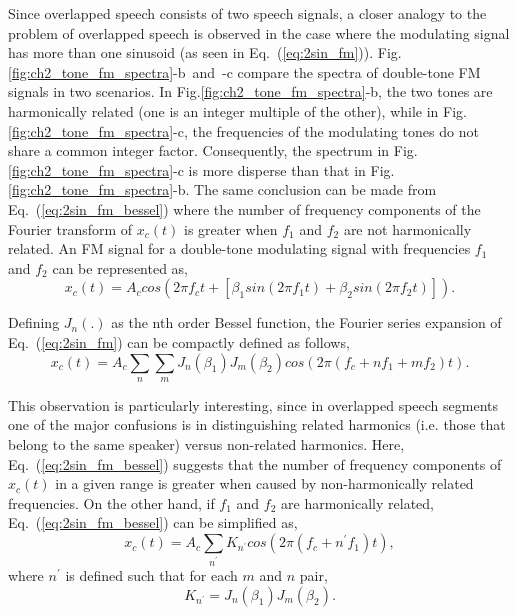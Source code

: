 {Since overlapped speech consists of two speech signals, a closer analogy to the problem of overlapped speech is observed in the case where the modulating signal has more than one sinusoid (as seen in Eq.~(\ref{eq:2sin_fm})). 
Fig.\ref{fig:ch2_tone_fm_spectra}-b~and~-c compare the spectra of double-tone FM signals in two scenarios. 
In Fig.\ref{fig:ch2_tone_fm_spectra}-b, the two tones are harmonically related (one is an integer multiple of the other), while in Fig.\ref{fig:ch2_tone_fm_spectra}-c, the frequencies of the modulating tones do not share a common integer factor. 
Consequently, the spectrum in Fig. \ref{fig:ch2_tone_fm_spectra}-c is more disperse than that in Fig.\ref{fig:ch2_tone_fm_spectra}-b. 
The same conclusion can be made from Eq.~(\ref{eq:2sin_fm_bessel}) where the number of frequency components of the Fourier transform of $x_c(t)$ is greater when $f_1$ and $f_2$ are not harmonically related. 
An FM signal for a double-tone modulating signal with frequencies $f_1$ and $f_2$ can be represented as,
\begin{equation}
\label{eq:2sin_fm}
x_c(t) = A_ccos(2\pi f_ct+[\beta_1 sin(2\pi f_1t) + \beta_2 sin(2\pi f_2t)]).
\end{equation}

Defining $J_n(.)$ as the nth order Bessel function, the Fourier series expansion of Eq.~(\ref{eq:2sin_fm}) can be compactly defined as follows, 
\begin{equation}
\label{eq:2sin_fm_bessel}
x_c(t) = A_c\sum\limits_n\sum\limits_m J_n(\beta_1)J_m(\beta_2)cos(2\pi (f_c+nf_1+mf_2)t).
\end{equation}

This observation is particularly interesting, since in overlapped speech segments one of the major confusions is in distinguishing related harmonics (i.e. those that belong to the same speaker) versus non-related harmonics. 
Here, Eq.~(\ref{eq:2sin_fm_bessel}) suggests that the number of frequency components of $x_c(t)$ in a given range is greater when caused by non-harmonically related frequencies. 
On the other hand, if $f_1$ and $f_2$ are harmonically related, Eq.~(\ref{eq:2sin_fm_bessel}) can be simplified as, 
\begin{equation}
\label{eq:2sin_fm_bessel_simplified}
x_c(t) = A_c\sum\limits_{n^\prime} K_{n^\prime}cos(2\pi (f_c + n^\prime f_1)t),
\end{equation}
where $n^\prime$ is defined such that for each $m$ and $n$ pair,
\begin{equation}
\label{eq:knprime}
K_{n^\prime} = J_n(\beta_1)J_m(\beta_2). 
\end{equation}


}

